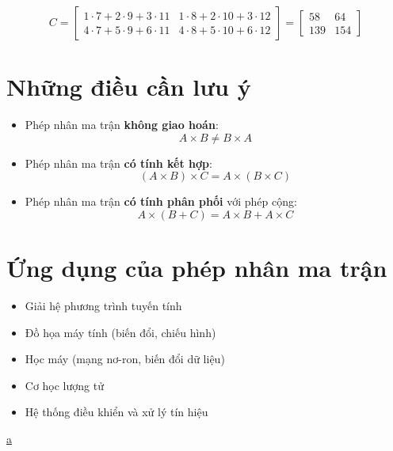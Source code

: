 \documentclass[12pt]{article}
\begin{document}
\[
C = \begin{bmatrix}
1 \cdot 7 + 2 \cdot 9 + 3 \cdot 11 & 1 \cdot 8 + 2 \cdot 10 + 3 \cdot 12 \\
4 \cdot 7 + 5 \cdot 9 + 6 \cdot 11 & 4 \cdot 8 + 5 \cdot 10 + 6 \cdot 12
\end{bmatrix}
=
\begin{bmatrix}
58 & 64 \\
139 & 154
\end{bmatrix}
\]

\section*{Những điều cần lưu ý}

\begin{itemize}
    \item Phép nhân ma trận \textbf{không giao hoán}:
    \[
    A \times B \neq B \times A
    \]
    \item Phép nhân ma trận \textbf{có tính kết hợp}:
    \[
    (A \times B) \times C = A \times (B \times C)
    \]
    \item Phép nhân ma trận \textbf{có tính phân phối} với phép cộng:
    \[
    A \times (B + C) = A \times B + A \times C
    \]
\end{itemize}

\section*{Ứng dụng của phép nhân ma trận}

\begin{itemize}
    \item Giải hệ phương trình tuyến tính
    \item Đồ họa máy tính (biến đổi, chiếu hình)
    \item Học máy (mạng nơ-ron, biến đổi dữ liệu)
    \item Cơ học lượng tử
    \item Hệ thống điều khiển và xử lý tín hiệu
\end{itemize}

\href{https://tratoa.github.io/a/a.html}{a}
\end{document}
